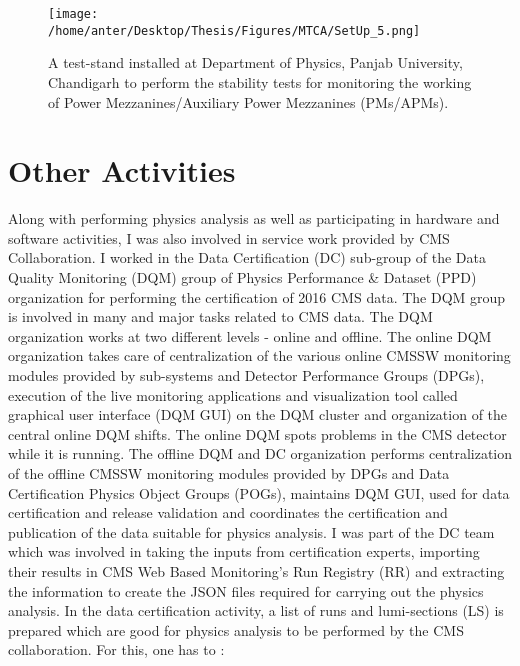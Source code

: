 \begin{figure}[!h]
\begin{center}
\vspace*{2mm} 
\texttt{[image: /home/anter/Desktop/Thesis/Figures/MTCA/SetUp\_5.png]}
\vspace*{4mm}
\caption{A test-stand installed at Department of Physics, Panjab University, Chandigarh to perform the stability tests for monitoring the working of Power Mezzanines/Auxiliary Power Mezzanines (PMs/APMs).}
\label{fig:mez}
\end{center}
\end{figure}

\section{Other Activities}
Along with performing physics analysis as well as participating in hardware and software activities, I was also involved in service work provided by CMS Collaboration. I worked in the Data Certification (DC) sub-group of the Data Quality Monitoring (DQM) group \cite{DQM} of Physics Performance \& Dataset (PPD) organization for performing the certification of 2016 CMS data. The DQM group is involved in many and major tasks related to CMS data. The DQM organization works at two different levels - online and offline. The online DQM organization takes care of centralization of the various online CMSSW monitoring modules provided by sub-systems and  Detector Performance Groups (DPGs), execution of the live monitoring applications and visualization tool called graphical user interface (DQM GUI) on the DQM cluster and organization of the central online DQM shifts. The online DQM spots problems in the CMS detector while it is running. The offline DQM and DC organization performs centralization of the offline CMSSW monitoring modules provided by DPGs and Data Certification Physics Object Groups (POGs), maintains DQM GUI, used for data certification and release validation and coordinates the certification and publication of the data suitable for physics analysis. I was part of the DC team which was involved in taking the inputs from certification experts, importing their results in CMS Web Based Monitoring's Run Registry (RR) and extracting the information to create the JSON files required for carrying out the physics analysis. In the data certification activity, a list of runs and lumi-sections (LS) is prepared which are good for physics analysis to be performed by the CMS collaboration. For this, one has to :

